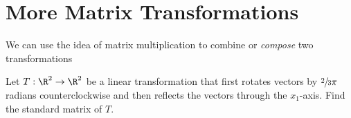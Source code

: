 
\section{More Matrix Transformations}
\label{sec:more_matrix_transformations}

We can use the idea of matrix multiplication to combine or \textit{compose} two
transformations

\begin{question}
  \label{qst:more_matrix_transformations}

  Let $T : \R^2 \to \R^2$ be a linear transformation that first rotates
  vectors by $\sfrac{2}{3}\pi$ radians counterclockwise and then reflects the
  vectors through the $x_1$-axis. Find the standard matrix of $T$.
\end{question}

